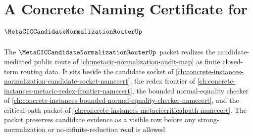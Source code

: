 \chapter{A Concrete Naming Certificate for $\MetaCICCandidateNormalizationRouterUp$}
\label{ch:concrete-instances-metacic-candidate-normalization-router-namecert}

The $\MetaCICCandidateNormalizationRouterUp$ packet realizes the candidate-mediated public route of \autoref{ch:metacic-normalization-audit-map} as finite closed-term routing data. It sits beside the candidate socket of \autoref{ch:concrete-instances-normalization-candidate-socket-namecert}, the redex frontier of \autoref{ch:concrete-instances-metacic-redex-frontier-namecert}, the bounded normal-equality checker of \autoref{ch:concrete-instances-bounded-normal-equality-checker-namecert}, and the critical-path packet of \autoref{ch:concrete-instances-metaciccriticalpath-namecert}. The packet preserves candidate evidence as a visible row before any strong-normalization or no-infinite-reduction read is allowed.

